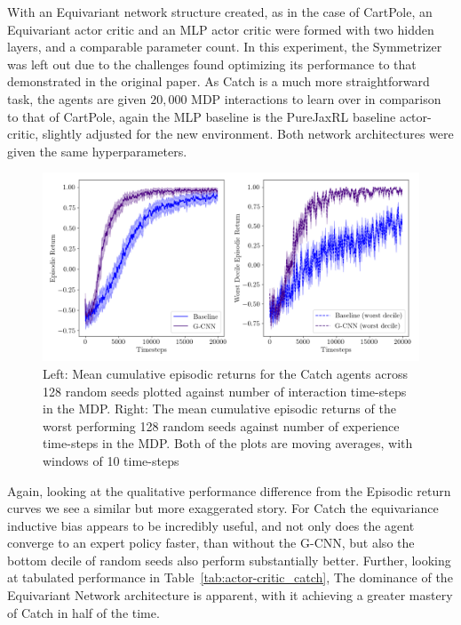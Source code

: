 With an Equivariant network structure created, as in the case of CartPole, an Equivariant actor critic and an MLP actor critic were formed with two hidden layers, and a comparable parameter count. In this experiment, the Symmetrizer was left out due to the challenges found optimizing its performance to that demonstrated in the original paper. As Catch is a much more straightforward task, the agents are given $20,000$ MDP interactions to learn over in comparison to that of CartPole, again the MLP baseline is the PureJaxRL baseline actor-critic, slightly adjusted for the new environment. Both network architectures were given the same hyperparameters.
\begin{figure}
	\begin{center}
		\includegraphics[width=\linewidth]{Figures/catch_returns.png}
		\caption{Left: Mean cumulative episodic returns for the Catch agents across 128 random seeds plotted against number of interaction time-steps in the MDP. Right: The mean cumulative episodic returns of the worst performing 128 random seeds against number of experience time-steps in the MDP. Both of the plots are moving averages, with windows of 10 time-steps}
	\end{center}
\end{figure}
Again, looking at the qualitative performance difference from the Episodic return curves we see a similar but more exaggerated story. For Catch the equivariance inductive bias appears to be incredibly useful, and not only does the agent converge to an expert policy faster, than without the G-CNN, but also the bottom decile of random seeds also perform substantially better. Further, looking at tabulated performance in Table~\ref{tab:actor-critic_catch}, The dominance of the Equivariant Network architecture is apparent, with it achieving a greater mastery of Catch in half of the time.

